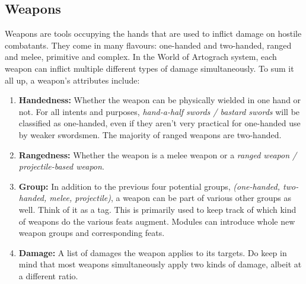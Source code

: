 \documentclass[openany,11pt,a4paper]{book}
\begin{document}
\subsection{Weapons}
Weapons are tools occupying the hands that are used to inflict damage on hostile combatants. They come in many flavours: one-handed and two-handed, ranged and melee, primitive and complex. In the World of Artograch system, each weapon can inflict multiple different types of damage simultaneously. To sum it all up, a weapon's attributes include:
\begin{enumerate}
  \item \textbf{Handedness:} Whether the weapon can be physically wielded in one hand or not. For all intents and purposes, \textit{hand-a-half swords / bastard swords} will be classified as one-handed, even if they aren't very practical for one-handed use by weaker swordsmen. The majority of ranged weapons are two-handed.
  \item \textbf{Rangedness:} Whether the weapon is a melee weapon or a \textit{ranged weapon / projectile-based weapon}.
  \item \textbf{Group:} In addition to the previous four potential groups, \textit{(one-handed, two-handed, melee, projectile)}, a weapon can be part of various other groups as well. Think of it as a tag. This is primarily used to keep track of which kind of weapons do the various feats augment. Modules can introduce whole new weapon groups and corresponding feats.
  \item \textbf{Damage:} A list of damages the weapon applies to its targets. Do keep in mind that most weapons simultaneously apply two kinds of damage, albeit at a different ratio.
\end{enumerate}
\end{document}
